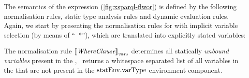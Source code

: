 \subsubsection{\SparqlForClause}
\label{sec:sparqlforclause-sem}
%
The semantics of the \SparqlForClause expression (\cref{fig:xsparql-flwor}) is defined by the following normalisation
rules, static type analysis rules and dynamic evaluation rules.
%
Again, we start by presenting the normalisation rules for  with implicit variable selection (by means
of ``\FOR~*''), which are translated into explicitly stated variables:
%
\begin{normalisationrule}
  {%
  }%
  \label{for_star}%
\end{normalisationrule}%
%
The normalisation rule $\left\llbracket{{\textit{WhereClause}}}\right\rrbracket_{\mathit{vars}}$ determines all statically \emph{unbound variables}
present in the \SparqlWhereClause, \ie~returns a whitespace separated list of all variables in the \SparqlWhereClause
that are not present in the $\mathrm{statEnv}{}.\textrm{varType}$ environment component.


